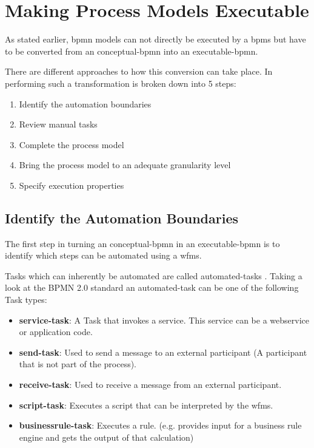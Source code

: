 \section{Making Process Models Executable}
As stated earlier, \gls{bpmn} models can not directly be executed by a \gls{bpms} but have to be converted from an \gls{conceptual-bpmn} into an \gls{executable-bpmn}. 

There are different approaches to how this conversion can take place. In \cite{fundamentals} performing such a transformation is broken down into 5 steps:
\begin{enumerate}
	\item Identify the automation boundaries
	\item Review manual tasks
	\item Complete the process model
	\item Bring the process model to an adequate granularity level
	\item Specify execution properties
\end{enumerate}

\subsection{Identify the Automation Boundaries}\label{automation}
The first step in turning an \gls{conceptual-bpmn} in an  \gls{executable-bpmn} is to identify which steps can be automated using a \gls{wfms}. 

Tasks which can inherently be automated are called \gls{automated-task}s \cite[p.~317]{fundamentals}. Taking a look at the BPMN 2.0 standard an \gls{automated-task} can be one of the following Task types:
\begin{itemize}
	\item \textbf{\gls{service-task}}: A Task that invokes a service. This service can be a webservice or application code.
	\item \textbf{\gls{send-task}}: Used to send a message to an external participant (A participant that is not part of the process).
	\item \textbf{\gls{receive-task}}: Used to receive a message from an external participant. 
	\item \textbf{\gls{script-task}}: Executes a script that can be interpreted by the \gls{wfms}.
	\item \textbf{\gls{businessrule-task}}: Executes a rule. (e.g. provides input for a business rule engine and gets the output of that calculation)
\end{itemize}

